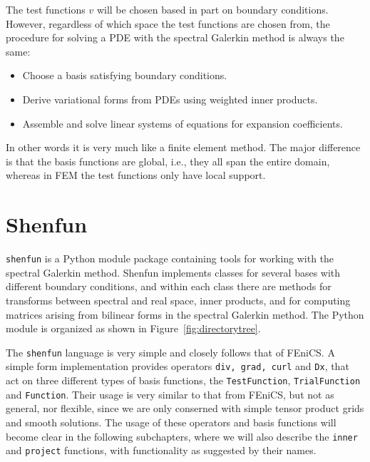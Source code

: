 \documentclass[%
oneside,                 %
final,                   %
10pt]{article}
\theoremstyle{definition}
\begin{document}
The test functions $v$ will be chosen based in part on boundary conditions. However, regardless of which space the test functions are chosen from, the procedure for solving a PDE with the spectral Galerkin method is always the same:

\begin{itemize}
  \item Choose a basis satisfying boundary conditions.

  \item Derive variational forms from PDEs using  weighted inner products.

  \item Assemble and solve linear systems of equations for expansion coefficients.
\end{itemize}

\noindent
In other words it is very much like a finite element method. The major difference is that the basis functions are global, i.e., they all span the entire domain, whereas in FEM the test functions only have local support.

\section{Shenfun}
\label{sec:shenfun}
\texttt{shenfun} is a Python module package containing tools for working with the spectral Galerkin method. Shenfun implements classes for several bases with different boundary conditions, and within each class there are methods for transforms between spectral and real space, inner products, and for computing matrices arising from bilinear forms in the spectral Galerkin method. The Python module is organized as shown in Figure~\ref{fig:directorytree}. 

The \texttt{shenfun} language is very simple and closely follows that of FEniCS. A simple form implementation provides operators \texttt{div, grad, curl} and \texttt{Dx}, that act on three different types of basis functions, the \texttt{TestFunction}, \texttt{TrialFunction} and \texttt{Function}. Their usage is very similar to that from FEniCS, but not as general, nor flexible, since we are only conserned with simple tensor product grids and smooth solutions. The usage of these operators and basis functions will become clear in the following subchapters, where we will also describe the \texttt{inner} and \texttt{project} functions, with functionality as suggested by their names.
\end{document}
